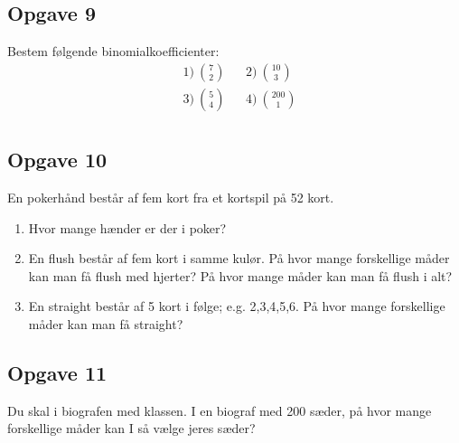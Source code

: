 \subsection*{Opgave 9}
Bestem følgende binomialkoefficienter:
\begin{align*}
&1) \ \binom{7}{2}  &&2) \ \binom{10}{3}  \\
&3) \ \binom{5}{4}  &&4) \ \binom{200}{1}   \\
\end{align*}

\subsection*{Opgave 10}
En pokerhånd består af fem kort fra et kortspil på 52 kort.
\begin{enumerate}[label=\roman*)]
\item Hvor mange hænder er der i poker?
\item En flush består af fem kort i samme kulør. På hvor mange forskellige måder kan man få flush med hjerter? På hvor mange måder kan man få flush i alt?
\item En straight består af 5 kort i følge; e.g. 2,3,4,5,6. På hvor mange forskellige måder kan man få straight?
\end{enumerate} 

\subsection*{Opgave 11}
Du skal i biografen med klassen. I en biograf med 200 sæder, på hvor mange forskellige måder kan I så vælge jeres sæder?

